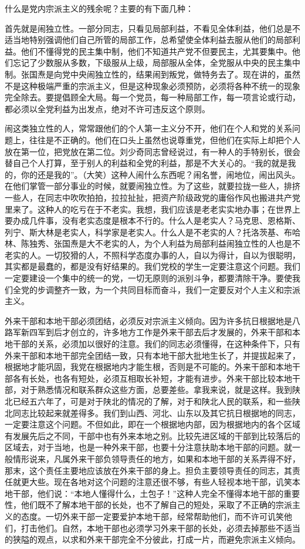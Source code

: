 什么是党内宗派主义的残余呢？主要的有下面几种：

首先就是闹独立性。一部分同志，只看见局部利益，不看见全体利益，他们总是不适当地特别强调他们自己所管的局部工作，总希望使全体利益去服从他们的局部利益。他们不懂得党的民主集中制，他们不知道共产党不但要民主，尤其要集中。他们忘记了少数服从多数，下级服从上级，局部服从全体，全党服从中央的民主集中制。张国焘是向党中央闹独立性的，结果闹到叛党，做特务去了。现在讲的，虽然不是这种极端严重的宗派主义，但是这种现象必须预防，必须将各种不统一的现象完全除去。要提倡顾全大局。每一个党员，每一种局部工作，每一项言论或行动，都必须以全党利益为出发点，绝对不许可违反这个原则。

闹这类独立性的人，常常跟他们的个人第一主义分不开，他们在个人和党的关系问题上，往往是不正确的。他们在口头上虽然也说尊重党，但他们在实际上却把个人放在第一位，把党放在第二位。刘少奇同志曾经说过，有一种人的手特别长，很会替自己个人打算，至于别人的利益和全党的利益，那是不大关心的。“我的就是我的，你的还是我的”。（大笑）这种人闹什么东西呢？闹名誉，闹地位，闹出风头。在他们掌管一部分事业的时候，就要闹独立性。为了这些，就要拉拢一些人，排挤一些人，在同志中吹吹拍拍，拉拉扯扯，把资产阶级政党的庸俗作风也搬进共产党里来了。这种人的吃亏在于不老实。我想，我们应该是老老实实地办事；在世界上要办成几件事，没有老实态度是根本不行的。什么人是老实人？马克思、恩格斯、列宁、斯大林是老实人，科学家是老实人。什么人是不老实的人？托洛茨基、布哈林、陈独秀、张国焘是大不老实的人，为个人利益为局部利益闹独立性的人也是不老实的人。一切狡猾的人，不照科学态度办事的人，自以为得计，自以为很聪明，其实都是最蠢的，都是没有好结果的。我们党校的学生一定要注意这个问题。我们一定要建设一个集中的统一的党，一切无原则的派别斗争，都要清除干净。要使我们全党的步调整齐一致，为一个共同目标而奋斗，我们一定要反对个人主义和宗派主义。

外来干部和本地干部必须团结，必须反对宗派主义倾向。因为许多抗日根据地是八路军新四军到后才创立的，许多地方工作是外来干部去后才发展的，外来干部和本地干部的关系，必须加以很好的注意。我们的同志必须懂得，在这种条件下，只有外来干部和本地干部完全团结一致，只有本地干部大批地生长了，并提拔起来了，根据地才能巩固，我党在根据地内才能生根，否则是不可能的。外来干部和本地干部各有长处，也各有短处，必须互相取长补短，才能有进步。外来干部比较本地干部，对于熟悉情况和联系群众这些方面，总要差些。拿我来说，就是这样。我到陕北已经五六年了，可是对于陕北的情况的了解，对于和陕北人民的联系，和一些陕北同志比较起来就差得多。我们到山西、河北、山东以及其它抗日根据地的同志，一定要注意这个问题。不但如此，即在一个根据地内部，因为根据地内的各个区域有发展先后之不同，干部中也有外来本地之别。比较先进区域的干部到比较落后的区域去，对于当地，也是一种外来干部，也要十分注意扶助本地干部的问题。就一般情形说来，凡属外来干部负领导责任的地方，如果和本地干部的关系弄得不好，那末，这个责任主要地应该放在外来干部的身上。担负主要领导责任的同志，其责任就更大些。现在各地对这个问题的注意还很不够，有些人轻视本地干部，讥笑本地干部，他们说：“本地人懂得什么，土包子！”这种人完全不懂得本地干部的重要性，他们既不了解本地干部的长处，也不了解自己的短处，采取了不正确的宗派主义的态度。一切外来干部一定要爱护本地干部，经常帮助他们，而不许可讥笑他们，打击他们。自然，本地干部也必须学习外来干部的长处，必须去掉那些不适当的狭隘的观点，以求和外来干部完全不分彼此，打成一片，而避免宗派主义倾向。

